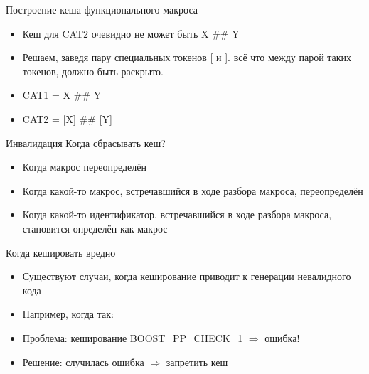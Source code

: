 \documentclass{beamer}
\begin{document}
\begin{frame}[t, fragile]{Построение кеша функционального макроса}

\lstCat
\begin{itemize}[<+->]
\item Кеш для CAT2 очевидно не может быть X \#\# Y

\item Решаем, заведя пару специальных токенов [ и ]. всё что между парой таких токенов, должно быть раскрыто.
\item CAT1 = X \#\# Y\\
\item CAT2 = [X] \#\# [Y]
\end{itemize}
\end{frame}

\begin{frame}[t, fragile]{Инвалидация}
Когда сбрасывать кеш?
\begin{itemize}[<+->]
\item Когда макрос переопределён
\item Когда какой-то макрос, встречавшийся в ходе разбора макроса, переопределён
\item Когда какой-то идентификатор, встречавшийся в ходе разбора макроса, становится определён как макрос
\end{itemize}


\end{frame}



\begin{frame}[t, fragile]{Когда кешировать вредно}

\begin{itemize}[<+->]
\item Существуют случаи, когда кеширование приводит к генерации невалидного кода
\item Например, когда так:
\invalidCache
\item Проблема: кеширование BOOST\_PP\_CHECK\_1 $\Rightarrow$ ошибка!
\item Решение: случилась ошибка $\Rightarrow$ запретить кеш
\end{itemize}
\end{frame}
\end{document}
